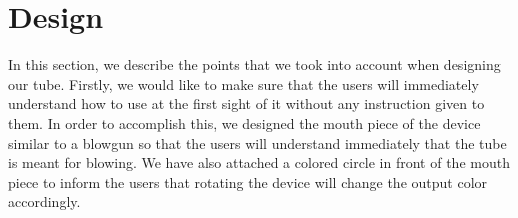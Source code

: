 \section{Design}\label{sec:design}

In this section, we describe the points that we took into account when designing our tube. Firstly, we would like to make sure that the users will immediately understand how to use \tube at the first sight of it without any instruction given to them. In order to accomplish this, we designed the mouth piece of the device similar to a blowgun so that the users will understand immediately that the tube is meant for blowing. We have also attached a colored circle in front of the mouth piece to inform the users that rotating the device will change the output color accordingly.

